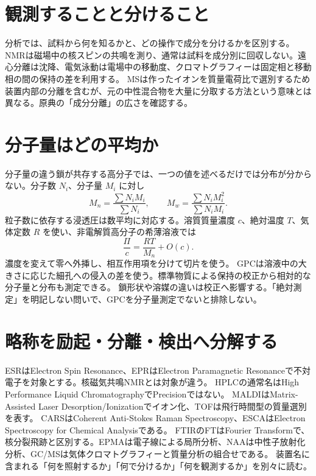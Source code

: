 \section{観測することと分けること}\label{theory:analysis:separation}
分析では、試料から何を知るかと、どの操作で成分を分けるかを区別する。NMRは磁場中の核スピンの共鳴を測り、通常は試料を成分別に回収しない。遠心分離は沈降、電気泳動は電場中の移動度、クロマトグラフィーは固定相と移動相の間の保持の差を利用する。
MSは作ったイオンを質量電荷比で選別するため装置内部の分離を含むが、元の中性混合物を大量に分取する方法という意味とは異なる\cite{analysis49_ms_ref}。原典の「成分分離」の広さを確認する。

\section{分子量はどの平均か}\label{theory:analysis:molar}
分子量の違う鎖が共存する高分子では、一つの値を述べるだけでは分布が分からない。分子数 \(N_i\)、分子量 \(M_i\) に対し
\[
 M_n=\frac{\sum N_iM_i}{\sum N_i},\qquad
 M_w=\frac{\sum N_iM_i^2}{\sum N_iM_i}.
\]
粒子数に依存する浸透圧は数平均に対応する。溶質質量濃度 \(c\)、絶対温度 \(T\)、気体定数 \(R\) を使い、非電解質高分子の希薄溶液では
\[
 \frac{\Pi}{c}=\frac{RT}{M_n}+O(c).
\]
濃度を変えて零へ外挿し、相互作用項を分けて切片を使う。
GPCは溶液中の大きさに応じた細孔への侵入の差を使う。標準物質による保持の校正から相対的な分子量と分布も測定できる\cite{analysis49_gpc_ref}。
鎖形状や溶媒の違いは校正へ影響する。「絶対測定」を明記しない問いで、GPCを分子量測定でないと排除しない。

\section{略称を励起・分離・検出へ分解する}\label{theory:analysis:acronyms}
ESRはElectron Spin Resonance、EPRはElectron Paramagnetic Resonanceで不対電子を対象とする。核磁気共鳴NMRとは対象が違う\cite{analysis49_esr_ref}。
HPLCの通常名はHigh Performance Liquid ChromatographyでPrecisionではない。
MALDIはMatrix-Assisted Laser Desorption/Ionizationでイオン化、TOFは飛行時間型の質量選別を表す\cite{analysis49_hplc_ref,analysis49_maldi_ref}。
CARSはCoherent Anti-Stokes Raman Spectroscopy、ESCAはElectron Spectroscopy for Chemical Analysisである\cite{analysis49_cars_ref,analysis49_xps_ref}。
FTIRのFTはFourier Transformで、核分裂飛跡と区別する。EPMAは電子線による局所分析、NAAは中性子放射化分析、GC/MSは気体クロマトグラフィーと質量分析の組合せである\cite{analysis49_epma_ref,analysis49_naa_ref}。
装置名に含まれる「何を照射するか」「何で分けるか」「何を観測するか」を別々に読む。

